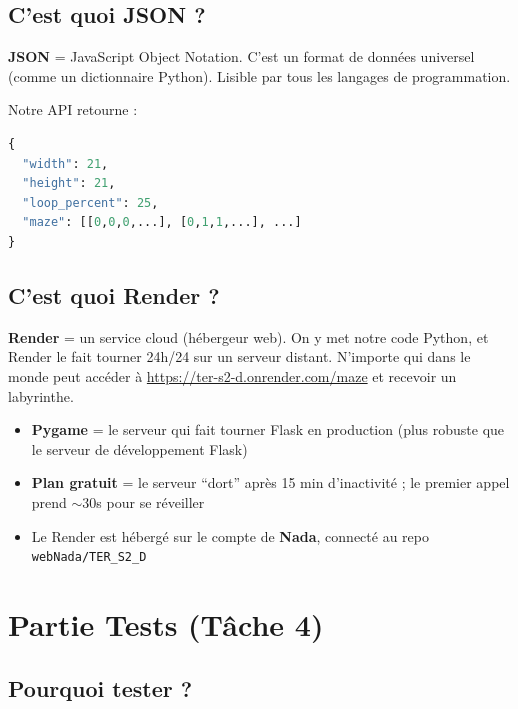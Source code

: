 \documentclass[12pt,a4paper]{article}
\begin{document}
\subsection{C'est quoi JSON ?}

\begin{definitionbox}
\textbf{JSON} = JavaScript Object Notation. C'est un format de données universel (comme un dictionnaire Python). Lisible par tous les langages de programmation.
\end{definitionbox}

Notre API retourne :
\begin{lstlisting}[language=Python]
{
  "width": 21,
  "height": 21,
  "loop_percent": 25,
  "maze": [[0,0,0,...], [0,1,1,...], ...]
}
\end{lstlisting}

\subsection{C'est quoi Render ?}

\begin{definitionbox}
\textbf{Render} = un service cloud (hébergeur web). On y met notre code Python, et Render le fait tourner 24h/24 sur un serveur distant. N'importe qui dans le monde peut accéder à \url{https://ter-s2-d.onrender.com/maze} et recevoir un labyrinthe.
\end{definitionbox}

\begin{itemize}
    \item \textbf{Pygame} = le serveur qui fait tourner Flask en production (plus robuste que le serveur de développement Flask)
    \item \textbf{Plan gratuit} = le serveur ``dort'' après 15 min d'inactivité ; le premier appel prend $\sim$30s pour se réveiller
    \item Le Render est hébergé sur le compte de \textbf{Nada}, connecté au repo \texttt{webNada/TER\_S2\_D}
\end{itemize}

\section{Partie Tests (Tâche 4)}

\subsection{Pourquoi tester ?}
\end{document}
